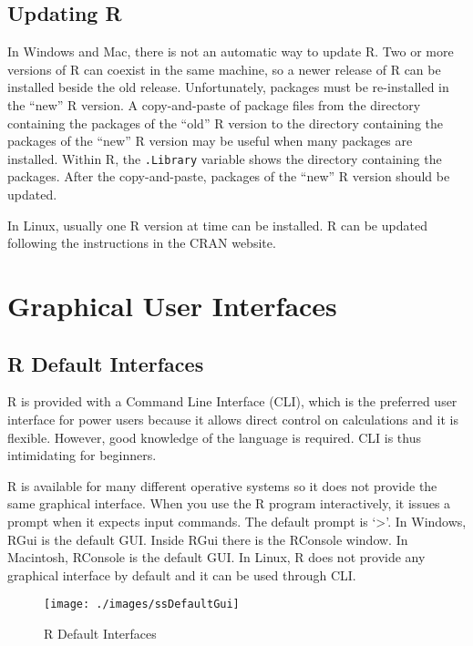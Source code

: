 \documentclass[]{book}
\begin{document}
\subsection{Updating R}\label{updating-r}

In Windows and Mac, there is not an automatic way to update R. Two or
more versions of R can coexist in the same machine, so a newer release
of R can be installed beside the old release. Unfortunately, packages
must be re-installed in the ``new'' R version. A copy-and-paste of
package files from the directory containing the packages of the ``old''
R version to the directory containing the packages of the ``new'' R
version may be useful when many packages are installed. Within R, the
\texttt{.Library} variable shows the directory containing the packages.
After the copy-and-paste, packages of the ``new'' R version should be
updated.

In Linux, usually one R version at time can be installed. R can be
updated following the instructions in the CRAN website.

\section{Graphical User Interfaces}\label{graphical-user-interfaces}

\subsection{R Default Interfaces}\label{r-default-interfaces}

R is provided with a Command Line Interface (CLI), which is the
preferred user interface for power users because it allows direct
control on calculations and it is flexible. However, good knowledge of
the language is required. CLI is thus intimidating for beginners.

R is available for many different operative systems so it does not
provide the same graphical interface. When you use the R program
interactively, it issues a prompt when it expects input commands. The
default prompt is `\textgreater{}'. In Windows, RGui is the default GUI.
Inside RGui there is the RConsole window. In Macintosh, RConsole is the
default GUI. In Linux, R does not provide any graphical interface by
default and it can be used through CLI.

\begin{figure}[h]

{\centering \texttt{[image: ./images/ssDefaultGui]} 

}

\caption{R Default Interfaces}\label{fig:g3}
\end{figure}
\end{document}
